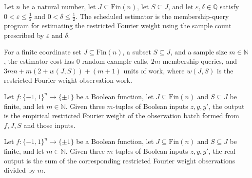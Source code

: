 \begin{definition}
\label{FABL.scheduledRestrictedFourierWeightEstimatorProgram}
\leanok
{}
Let $n$ be a natural number, let $J\subseteq\mathrm{Fin}(n)$, let $S\subseteq J$, and
let $\varepsilon,\delta\in\mathbb Q$ satisfy $0<\varepsilon\leq\tfrac12$ and
$0<\delta\leq\tfrac12$. The scheduled estimator is the membership-query program for
estimating the restricted Fourier weight using the sample count prescribed by
$\varepsilon$ and $\delta$.
\end{definition}

\begin{definition}
\label{FABL.restrictedFourierWeightEstimatorCost}
\leanok
{}
For a finite coordinate set $J\subseteq\mathrm{Fin}(n)$, a subset $S\subseteq J$, and a
sample size $m\in\mathbb{N}$, the estimator cost has $0$ random-example calls, $2m$
membership queries, and $3mn+m(2+w(J,S))+(m+1)$ units of work, where $w(J,S)$ is the
restricted Fourier weight observation work.
\end{definition}

\begin{definition}
\label{FABL.restrictedFourierWeightEstimatorOutput}
\leanok
{}
Let $f:\{-1,1\}^{n}\to\{\pm1\}$ be a Boolean function, let $J\subseteq\mathrm{Fin}(n)$
and $S\subseteq J$ be finite, and let $m\in\mathbb{N}$. Given three $m$-tuples of
Boolean inputs $z,y,y'$, the output is the empirical restricted Fourier weight of the
observation batch formed from $f,J,S$ and those inputs.
\end{definition}

\begin{definition}
\label{FABL.realRestrictedFourierWeightEstimatorOutput}
\leanok
{}
Let $f:\{-1,1\}^{n}\to\{\pm1\}$ be a Boolean function, let $J\subseteq\mathrm{Fin}(n)$
and $S\subseteq J$ be finite, and let $m\in\mathbb{N}$. Given three $m$-tuples of
Boolean inputs $z,y,y'$, the real output is the sum of the corresponding restricted
Fourier weight observations divided by $m$.
\end{definition}

